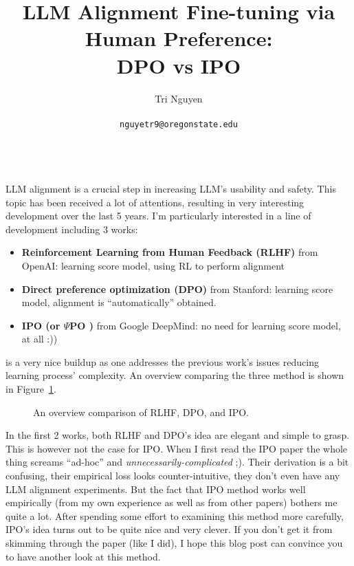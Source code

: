 \documentclass[11pt,a4paper]{article}
\title{LLM Alignment Fine-tuning via Human Preference: \\
DPO vs IPO}
\author{	Tri Nguyen \\\\
        \texttt{nguyetr9@oregonstate.edu} \\\\
        }
\begin{document}
\maketitle
LLM alignment is a crucial step in increasing LLM's usability and safety.
This topic has been received a lot of attentions, resulting in very interesting development over the last 5 years. 
I'm particularly interested in a line of development including 3 works: 
\begin{itemize}
    \item \textbf{Reinforcement Learning from Human Feedback (RLHF)} \cite{ouyang2022training,christiano2017deep,bai2022constitutional,stiennon2020learning} from OpenAI: learning score model, using RL to perform alignment
    \item \textbf{Direct preference optimization (DPO)} \cite{rafailov2023direct} from Stanford: learning score model, alignment is ``automatically'' obtained.
    \item \textbf{IPO (or $\Psi$PO )} \cite{azar2023general} from Google DeepMind: no need for learning score model, at all :))
\end{itemize}
is a very nice buildup as one addresses the previous work's issues reducing learning process' complexity. An overview comparing the three method is shown in Figure~\ref{fig:overview}.

\begin{figure}[ht]
    \centering
    \resizebox{\linewidth}{!}{
        
    }
    \caption{An overview comparison of RLHF, DPO, and IPO.}
    \label{fig:overview}
\end{figure}

In the first 2 works, both RLHF and DPO's idea are elegant and simple to grasp. This is however not the case for IPO. When I first read the IPO paper the whole thing screams ``ad-hoc'' and \textit{unnecessarily-complicated} ;). Their derivation is a bit confusing, their empirical loss looks counter-intuitive, they  don't even have any LLM alignment experiments.
But the fact that IPO method works well empirically (from my own experience as well as from other papers) bothers me quite a lot.
After spending some effort to examining this method more carefully, IPO's idea turns out to be quite nice and very clever. If you don't get it from skimming through the paper (like I did), I hope this blog post can convince you to have another look at this method.
\end{document}

